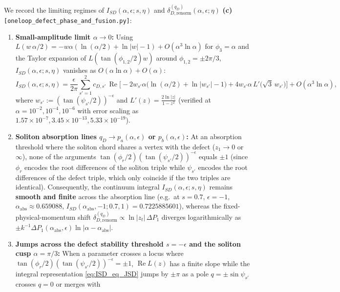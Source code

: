 \documentclass[11pt,a4paper]{article}
\newcommand{\Rea}{\operatorname{Re}}
\begin{document}
We record the limiting regimes of $I_{SD}(\alpha,\epsilon;s,\eta)$ and
$\delta_{D,\mathrm{renorm}}^{(q_D)}(\alpha,\epsilon;\eta)$ \textbf{(c)}
\texttt{[oneloop\_defect\_phase\_and\_fusion.py]}:
\begin{enumerate}
\item \textbf{Small-amplitude limit $\alpha \to 0$:}
Using $L(w\,\alpha/2) = -w\alpha(\ln(\alpha/2)+\ln|w|-1) + O(\alpha^3\ln\alpha)$
for $\phi_3 = \alpha$ and the Taylor expansion of $L(\tan(\phi_{1,2}/2)w)$ around
$\phi_{1,2} = \pm 2\pi/3$, $I_{SD}(\alpha,\epsilon;s,\eta)$ vanishes as
$O(\alpha\ln\alpha) + O(\alpha)$:
\begin{equation}\label{eq:ISD_small_alpha}
  I_{SD}(\alpha,\epsilon;s,\eta)
  = \frac{\epsilon}{2\pi}\sum_{s'=1}^2 c_{D,s'}\,\Rea\!\Big[
    -2w_{s'}\alpha\big(\ln(\alpha/2) + \ln|w_{s'}| - 1\big)
    + 4w_{s'}\alpha\,L'\big(\sqrt{3}\,w_{s'}\big)\Big]
  + O(\alpha^3\ln\alpha),
\end{equation}
where $w_{s'} := (\tan(\psi_{s'}/2))^{-\epsilon}$ and $L'(z) = \frac{2\ln|z|}{1-z^2}$
(verified at $\alpha = 10^{-2}, 10^{-4}, 10^{-6}$ with error scaling as
$1.57\times 10^{-7}, 3.45\times 10^{-13}, 5.33\times 10^{-19}$).
\item \textbf{Soliton absorption lines $q_D \to p_a(\alpha,\epsilon)$ or $p_b(\alpha,\epsilon)$:}
At an absorption threshold where the soliton chord shares a vertex with the
defect ($z_1 \to 0$ or $\infty$), none of the arguments
$\tan(\phi_r/2)(\tan(\psi_{s'}/2))^{-\epsilon}$ equals $\pm 1$ (since $\phi_r$
encodes the root differences of the soliton triple while $\psi_{s'}$ encodes the
root differences of the defect triple, which only coincide if the two triples are
identical). Consequently, the continuum integral $I_{SD}(\alpha,\epsilon;s,\eta)$
remains \textbf{smooth and finite} across the absorption line (e.g.\ at $s=0.7$,
$\epsilon=-1$, $\alpha_{\mathrm{abs}} \approx 0.659088$,
$I_{SD}(\alpha_{\mathrm{abs}},-1;0.7,1) = 0.7225885601$), whereas the
fixed-physical-momentum shift $\delta_{D,\mathrm{renorm}}^{(q_D)} \propto \ln|z_t|\,\Delta P_1$
diverges logarithmically as $\pm k^{-1}\Delta P_1(\alpha_{\mathrm{abs}},\epsilon)\ln|\alpha-\alpha_{\mathrm{abs}}|$.
\item \textbf{Jumps across the defect stability threshold $s = -\epsilon$ and the soliton cusp $\alpha = \pi/3$:}
When a parameter crosses a locus where $\tan(\phi_r/2)(\tan(\psi_{s'}/2))^{-\epsilon} = \pm 1$,
$\Rea L(z)$ has a finite slope while the integral representation \eqref{eq:ISD_eq_JSD}
jumps by $\pm\pi$ as a pole $q = \pm\sin\psi_{s'}$ crosses $q=0$ or merges with

\end{enumerate}
\end{document}
